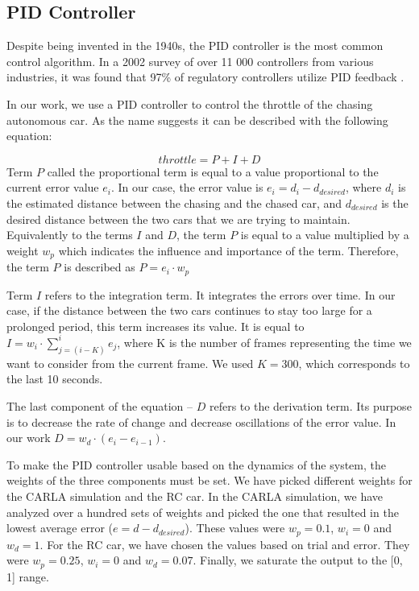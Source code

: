 \documentclass{ctuthesis/ctuthesis}
\begin{document}
\subsection{PID Controller}
Despite being invented in the 1940s, the PID controller is the most common control algorithm. In a 2002 survey of over 11 000 controllers from various industries, it was found that 97\% of regulatory controllers utilize PID feedback \cite{PID-usage}. 

In our work, we use a PID controller to control the throttle of the chasing autonomous car. As the name suggests it can be described with the following equation:

\begin{equation}
throttle = P+I+D    
\end{equation}
Term $P$ called the proportional term is equal to a value proportional to the current error value $e_i$. In our case, the error value is $e_i = d_i - d_{desired}$, where $d_i$ is the estimated distance between the chasing and the chased car, and $d_{desired}$ is the desired distance between the two cars that we are trying to maintain. Equivalently to the terms $I$ and $D$, the term $P$ is equal to a value multiplied by a weight $w_p$ which indicates the influence and importance of the term. Therefore, the term $P$ is described as $P = e_i\cdot w_p$ \par


Term $I$ refers to the integration term. It integrates the errors over time. In our case, if the distance between the two cars continues to stay too large for a prolonged period, this term increases its value. It is equal to $I = w_i\cdot \sum_{j=(i-K)}^{i} e_j$, where K is the number of frames representing the time we want to consider from the current frame. We used $K = 300$, which corresponds to the last 10 seconds.\par


The last component of the equation -- $D$ refers to the derivation term. Its purpose is to decrease the rate of change and decrease oscillations of the error value. In our work $D = w_d\cdot (e_i-e_{i-1})$. \par


To make the PID controller usable based on the dynamics of the system, the weights of the three components must be set. We have picked different weights for the CARLA simulation and the RC car. In the CARLA simulation, we have analyzed over a hundred sets of weights and picked the one that resulted in the lowest average error ($e = d - d_{desired}$). These values were $w_p=0.1$, $w_i=0$ and $w_d=1$. For the RC car, we have chosen the values based on trial and error. They were $w_p=0.25$, $w_i=0$ and $w_d=0.07$. Finally, we saturate the output to the [0, 1] range. \par
\end{document}
